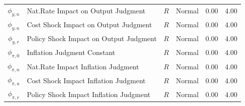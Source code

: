 \documentclass[12pt]{article}
\begin{document}
{\begin{table}
\begin{center}
\begin{tabular}{c|l|c||c|cc}
$\phi_{y,n}$ & Nat.Rate Impact on Output Judgment & $R$ & Normal & 0.00 & 4.00 \\ 
$\phi_{y,u}$ & Cost Shock Impact on Output Judgment & $R$ & Normal & 0.00 & 4.00 \\ 
$\phi_{y,r}$ & Policy Shock Impact on Output Judgment & $R$ & Normal & 0.00 & 4.00 \\ 
$\phi_{\pi,0}$ & Inflation Judgment Constant & $R$ & Normal & 0.00 & 4.00 \\ 
$\phi_{\pi,n}$ & Nat.Rate Impact Inflation Judgment & $R$ & Normal & 0.00 & 4.00 \\ 
$\phi_{\pi,u}$ & Cost Shock Impact Inflation Judgment & $R$ & Normal & 0.00 & 4.00 \\ 
$\phi_{\pi,r}$ & Policy Shock Impact Inflation Judgment & $R$ & Normal & 0.00 & 4.00 \\ \hline
\end{tabular}
\end{center}
\end{table}

}
\end{document}
